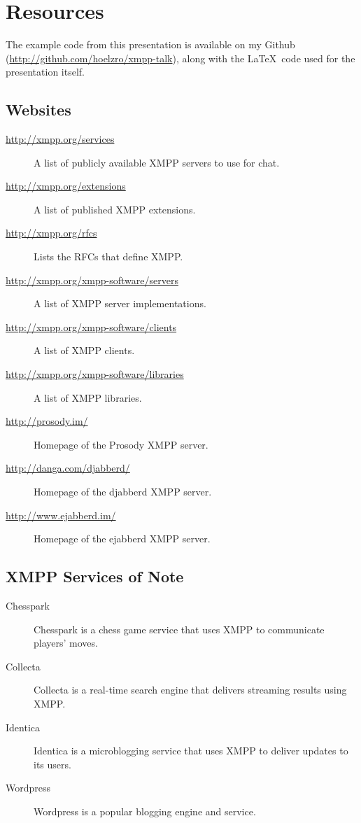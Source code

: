 \appendix
\section{Resources}

The example code from this presentation is available on my Github (\url{http://github.com/hoelzro/xmpp-talk}), along
with the \LaTeX\ code used for the presentation itself.

\subsection*{Websites}

\begin{description}
\item[\url{http://xmpp.org/services}] A list of publicly available XMPP servers to use for chat.
\item[\url{http://xmpp.org/extensions}] A list of published XMPP extensions.
\item[\url{http://xmpp.org/rfcs}] Lists the RFCs that define XMPP.
\item[\url{http://xmpp.org/xmpp-software/servers}] A list of XMPP server implementations.
\item[\url{http://xmpp.org/xmpp-software/clients}] A list of XMPP clients.
\item[\url{http://xmpp.org/xmpp-software/libraries}] A list of XMPP libraries.
\item[\url{http://prosody.im/}] Homepage of the Prosody XMPP server.
\item[\url{http://danga.com/djabberd/}] Homepage of the djabberd XMPP server.
\item[\url{http://www.ejabberd.im/}] Homepage of the ejabberd XMPP server.
\end{description}

\subsection*{XMPP Services of Note}

\begin{description}
\item[Chesspark] Chesspark is a chess game service that uses XMPP to communicate players' moves.
\item[Collecta]  Collecta is a real-time search engine that delivers streaming results using XMPP.
\item[Identica]  Identica is a microblogging service that uses XMPP to deliver updates to its users.
\item[Wordpress]  Wordpress is a popular blogging engine and service.
\end{description}

